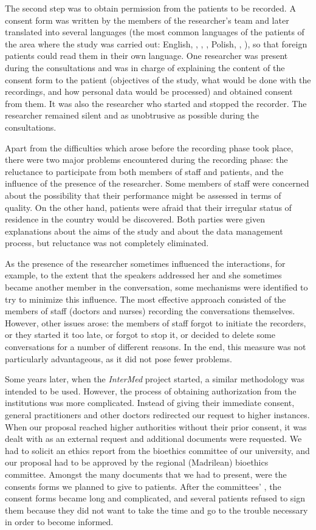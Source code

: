 \documentclass[output=paper]{LSP/langsci}
\begin{document}
The second step was to obtain permission from the patients to be recorded. A consent form was written by the members of the researcher's team and later translated into several languages (the most common languages of the patients of the area where the study was carried out: English, , , , Polish, , ), so that foreign patients could read them in their own language. One researcher was present during the consultations and was in charge of explaining the content of the consent form to the patient (objectives of the study, what would be done with the recordings, and how personal data would be processed) and obtained consent from them. It was also the researcher who started and stopped the recorder. The researcher remained silent and as unobtrusive as possible during the consultations.

Apart from the difficulties which arose before the recording phase took place, there were two major problems encountered during the recording phase: the reluctance to participate from both members of staff and patients, and the influence of the presence of the researcher. Some members of staff were concerned about the possibility that their performance might be assessed in terms of quality. On the other hand, patients were afraid that their irregular status of residence in the country would be discovered. Both parties were given explanations about the aims of the study and about the data management process, but reluctance was not completely eliminated.

As the presence of the researcher sometimes influenced the interactions, for example, to the extent that the speakers addressed her and she sometimes became another member in the conversation, some mechanisms were identified to try to minimize this influence. The most effective approach consisted of the members of staff (doctors and nurses) recording the conversations themselves. However, other issues arose: the members of staff forgot to initiate the recorders, or they started it too late, or forgot to stop it, or decided to delete some conversations for a number of different reasons. In the end, this measure was not particularly advantageous, as it did not pose fewer problems.

Some years later, when the \textit{InterMed} project started, a similar methodology was intended to be used. However, the process of obtaining authorization from the institutions was more complicated. Instead of giving their immediate consent, general practitioners and other doctors redirected our request to higher instances. When our proposal reached higher authorities without their prior consent, it was dealt with as an external request and additional documents were requested. We had to solicit an ethics report from the bioethics committee of our university, and our proposal had to be approved by the regional (Madrilean) bioethics committee. Amongst the many documents that we had to present, were the consents forms we planned to give to patients. After the committees' , the consent forms became long and complicated, and several patients refused to sign them because they did not want to take the time and go to the trouble necessary in order to become informed. 
\end{document}
